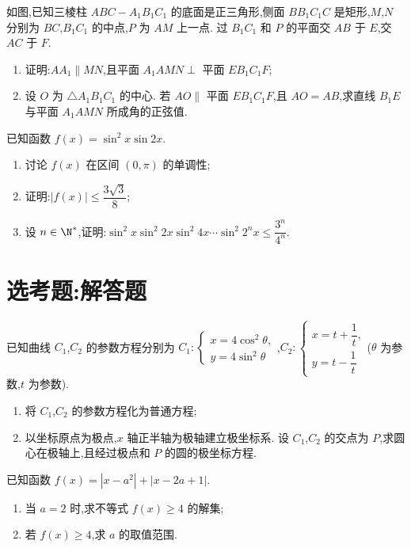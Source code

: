 \begin{problem}
如图,已知三棱柱 \(ABC-A_1B_1C_1\) 的底面是正三角形,侧面 \(BB_1C_1C\) 是矩形,\(M\),\(N\) 分别为 \(BC\),\(B_1C_1\) 的中点,\(P\) 为 \(AM\) 上一点. 过 \(B_1C_1\) 和 \(P\) 的平面交 \(AB\) 于 \(E\),交 \(AC\) 于 \(F\).

\begin{enumerate}
\item 证明:\(AA_1\parallel MN\),且平面 \(A_1AMN\perp\) 平面 \(EB_1C_1F\);
\item 设 \(O\) 为 \(\triangle A_1B_1C_1\) 的中心. 若 \(AO\parallel\) 平面 \(EB_1C_1F\),且 \(AO=AB\),求直线 \(B_1E\) 与平面 \(A_1AMN\) 所成角的正弦值.
\end{enumerate}

\end{problem}

\begin{problem}
已知函数 \(f(x)=\sin^2 x\sin 2x\).

\begin{enumerate}
\item 讨论 \(f(x)\) 在区间 \((0,\pi)\) 的单调性;
\item 证明:\(|f(x)|\leq \dfrac{3\sqrt3}{8}\);
\item 设 \(n\in\N^*\),证明:\(\sin^2 x\sin^2 2x\sin^2 4x\cdots \sin^2 2^n x\leq \dfrac{3^n}{4^n}\).
\end{enumerate}
\end{problem}

\section{选考题:解答题}

\begin{problem}
已知曲线 \(C_1\),\(C_2\) 的参数方程分别为 \(C_1:\begin{cases}
x=4\cos^2\theta,\\
y=4\sin^2\theta
\end{cases}\),\(C_2:\begin{cases}
x=t+\dfrac{1}{t},\\
y=t-\dfrac{1}{t}
\end{cases}\)(\(\theta\) 为参数,\(t\) 为参数).

\begin{enumerate}
\item 将 \(C_1\),\(C_2\) 的参数方程化为普通方程;
\item 以坐标原点为极点,\(x\) 轴正半轴为极轴建立极坐标系. 设 \(C_1\),\(C_2\) 的交点为 \(P\),求圆心在极轴上,且经过极点和 \(P\) 的圆的极坐标方程.
\end{enumerate}
\end{problem}

\begin{problem}
已知函数 \(f(x)=|x-a^2|+|x-2a+1|\).

\begin{enumerate}
\item 当 \(a=2\) 时,求不等式 \(f(x)\geq 4\) 的解集;
\item 若 \(f(x)\geq 4\),求 \(a\) 的取值范围.
\end{enumerate}
\end{problem}

